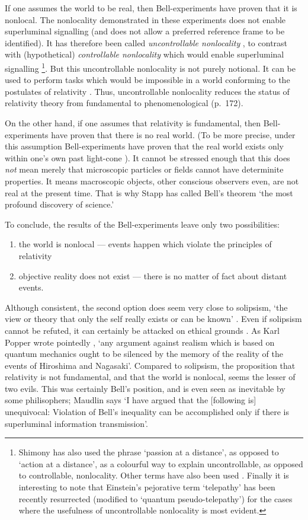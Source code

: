 \documentclass[12pt]{iopart}
\begin{document}
If one assumes the world to be real, then Bell-experiments have proven that it is nonlocal. 
The nonlocality demonstrated in these experiments  does not enable superluminal signalling 
(and does not allow a preferred reference frame to be identified). 
 It has therefore been called {\em uncontrollable nonlocality} \cite{Shi84}, to contrast with (hypothetical) {\em controllable nonlocality} which would enable superluminal signalling \footnote{Shimony \cite{Shi93} has also used the phrase  `passion at a distance',  as opposed to `action at a distance', as a colourful way to explain uncontrollable, as opposed to controllable,  nonlocality. Other terms have also been used \cite{Jar84}. Finally it is interesting to note that Einstein's pejorative term `telepathy' \cite{Ein46} has been recently resurrected (modified to `quantum pseudo-telepathy') \cite{Bra04} for the cases where the usefulness of uncontrollable nonlocality is most evident.}. 
But this uncontrollable nonlocality 
is not purely notional. It can be used to perform tasks \cite{Bra04,JacWis05} which would be  impossible in a world conforming to the postulates of relativity \cite{Mau94}.  Thus, uncontrollable nonlocality reduces the status of relativity theory from fundamental to phenomenological \cite{Bel87} (p.~172).
  
On the other hand, if one assumes that relativity is fundamental, then Bell-experiments have proven that there is no real world. (To be more precise, under this assumption  
Bell-experiments have proven that  the real world exists only within one's own past light-cone \cite{Ken05}). It cannot be stressed enough that this does
{\em not} mean merely that microscopic particles or fields cannot  
have determinite properties. It means macroscopic objects, other conscious observers even, 
are not real at the present time. 
That is why Stapp \cite{Sta77} has called Bell's theorem `the
most profound discovery of science.'

To conclude,  the results of the Bell-experiments leave only two
 possibilities:
 \begin{enumerate}
\item the world is nonlocal --- events happen which violate the principles of relativity
\item objective reality does not exist --- there is no matter of fact about distant events. 
\end{enumerate} 
Although consistent, the second option does seem very close to solipsism, 
`the view or theory that only the self really exists or can be known' \cite{OED}. 
Even if solipsism cannot be refuted, it can certainly be attacked on ethical grounds \cite{Bel81a}. 
 As Karl Popper wrote pointedly  \cite{Pop85},  `any argument against realism which is based on quantum mechanics ought to be silenced by the memory of the reality of the events of Hiroshima and Nagasaki'.  Compared to solipsism, the proposition that relativity is not fundamental, and that 
the world is nonlocal, seems the lesser of two evils. This was certainly Bell's position, and is even seen as inevitable by some philisophers; Maudlin says \cite{Mau94}  
`I have argued that the [following is] unequivocal: Violation of
Bell's inequality can be accomplished only if there is superluminal
information transmission'.  
\end{document}
